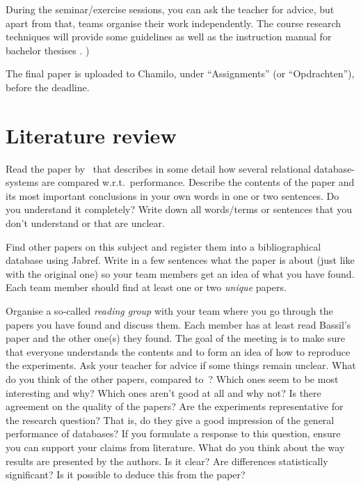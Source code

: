 \documentclass[fleqn,10pt]{artikeltin}
\begin{document}
During the seminar/exercise sessions, you can ask the teacher for advice, but apart from that, teams organise their work independently. The course research techniques will provide some guidelines as well as the instruction manual for bachelor thesises \autocite{VanVreckem}.  )

The final paper is uploaded to Chamilo, under ``Assignments'' (or ``Opdrachten''), before the deadline.


\section{Literature review}
\label{sec:literature-review}

Read the paper by~\textcite{Bassil2012} that describes in some detail how several relational database-systems are compared w.r.t.~performance. Describe the contents of the paper and its most important conclusions in your own words in one or two sentences. Do you understand it completely? Write down all words/terms or sentences that you don't understand or that are unclear.

Find other papers on this subject and register them into a bibliographical database using Jabref. Write in a few sentences what the paper is about (just like with the original one) so your team members get an idea of what you have found. Each team member should find at least one or two \emph{unique} papers.

Organise a so-called \emph{reading group} with your team where you go through the papers you have found and discuss them. Each member has at least read Bassil's paper and the other one(s) they found. The goal of the meeting is to make sure that everyone understands the contents and to form an idea of how to reproduce the experiments. Ask your teacher for advice if some things remain unclear. What do you think of the other papers, compared to~\textcite{Bassil2012}? Which ones seem to be most interesting and why? Which ones aren't good at all and why not? Is there agreement on the quality of the papers? Are the experiments representative for the research question? That is, do they give a good impression of the general performance of databases? If you formulate a response to this question, ensure you can support your claims from literature. What do you think about the way results are presented by the authors. Is it clear? Are differences statistically significant? Is it possible to deduce this from the paper?
\end{document}
